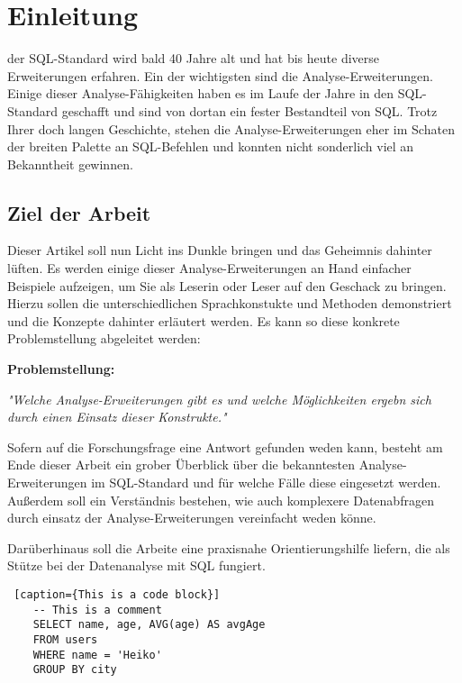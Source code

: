 \chapter{Einleitung}
der SQL-Standard wird bald 40 Jahre alt und hat bis heute diverse
Erweiterungen erfahren. Ein der wichtigsten sind die Analyse-Erweiterungen. Einige
dieser Analyse-Fähigkeiten haben es im Laufe der Jahre in den SQL-Standard
geschafft und sind von dortan ein fester Bestandteil von SQL. Trotz Ihrer doch
langen Geschichte, stehen die Analyse-Erweiterungen eher im Schaten der breiten
Palette an SQL-Befehlen und konnten nicht sonderlich viel an Bekanntheit gewinnen.


\section{Ziel der Arbeit}
Dieser Artikel soll nun Licht ins Dunkle bringen und das Geheimnis dahinter lüften.
Es werden einige dieser Analyse-Erweiterungen an Hand einfacher Beispiele aufzeigen,
um Sie als Leserin oder Leser auf den Geschack zu bringen. Hierzu sollen die
unterschiedlichen Sprachkonstukte und Methoden demonstriert und die Konzepte
dahinter erläutert werden. Es kann so diese konkrete Problemstellung abgeleitet
werden:

\textbf{Problemstellung:}
\begin{center}
    \textit{"Welche Analyse-Erweiterungen gibt es und welche Möglichkeiten ergebn sich durch
    einen Einsatz dieser Konstrukte."}
\end{center}

Sofern auf die Forschungsfrage eine Antwort gefunden weden kann, besteht am Ende
dieser Arbeit ein grober Überblick über die bekanntesten Analyse-Erweiterungen im
SQL-Standard und für welche Fälle diese eingesetzt werden. Außerdem soll
ein Verständnis bestehen, wie auch komplexere Datenabfragen durch einsatz der
Analyse-Erweiterungen vereinfacht weden könne.

Darüberhinaus soll die Arbeite eine praxisnahe Orientierungshilfe liefern, die als
Stütze bei der Datenanalyse mit SQL fungiert.










\begin{lstlisting} [caption={This is a code block}]
    -- This is a comment
    SELECT name, age, AVG(age) AS avgAge
    FROM users
    WHERE name = 'Heiko'
    GROUP BY city
\end{lstlisting}




